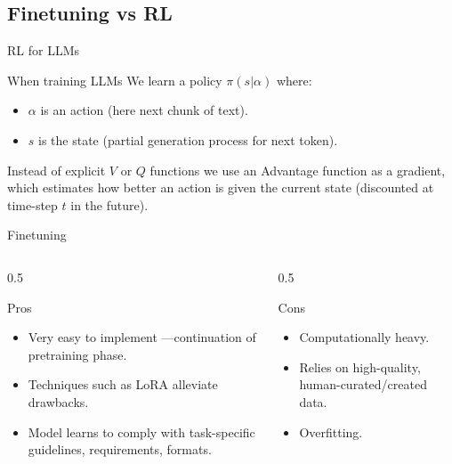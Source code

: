 \documentclass[24pt]{beamer}
\begin{document}
\subsection{Finetuning vs RL}

\begin{frame}{RL for LLMs}
	\begin{block}{When training LLMs}
		We learn a policy $\pi(s \lvert \alpha)$ where:
		\begin{itemize}
			\item $\alpha$ is an action (here next chunk of text).
			\item $s$ is the state (partial generation process for next token).
		\end{itemize}
		Instead of explicit $V$ or $Q$ functions we use an \alert{Advantage function} as a \alert{gradient}, which estimates how better an action is given the current state (discounted at time-step $t$  in the future).
	\end{block}
\end{frame}

\begin{frame}{Finetuning}
	\begin{columns}
		\begin{column}{0.5\textwidth}
			\begin{exampleblock}{Pros}
				\begin{itemize}
					\item Very easy to implement ---continuation of pretraining phase.
					\item Techniques such as LoRA alleviate drawbacks.
					\item Model learns to comply with task-specific guidelines, requirements, formats.
				\end{itemize}
			\end{exampleblock}
		\end{column}
		\begin{column}{0.5\textwidth}
			\begin{alertblock}{Cons}
				\begin{itemize}
					\item Computationally heavy.
					\item Relies on high-quality, human-curated/created data.
					\item Overfitting.
				\end{itemize}
			\end{alertblock}
		\end{column}
	\end{columns}
\end{frame}
\end{document}
